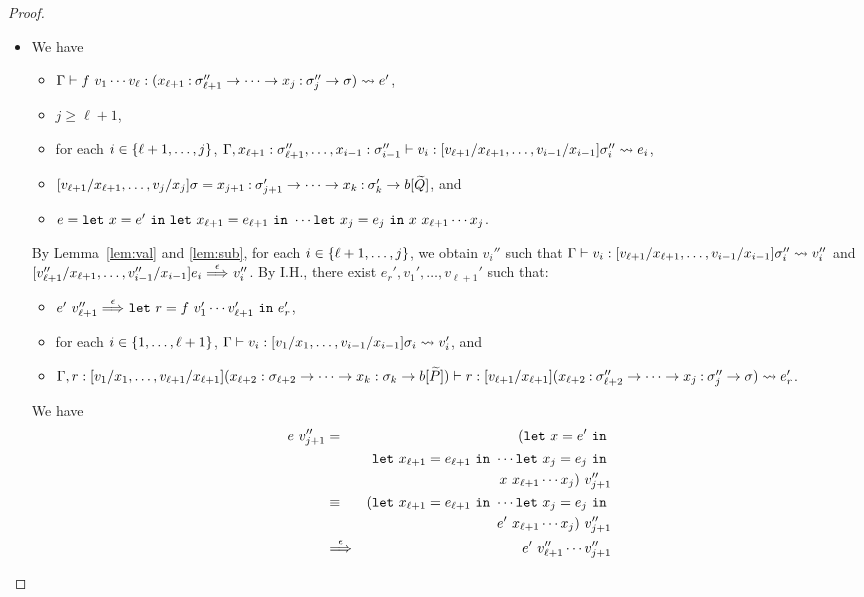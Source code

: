 \begin{proof}
\begin{itemize}
\item[] 
We have
\begin{itemize}
\item \(\Gamma \vdash f\ v_1\cdots v_{\ell} : (x_{\ell+1}\mathbin{:}\sigma_{\ell+1}'' \to \cdots \to x_j\mathbin{:}\sigma_j'' \to \sigma) \leadsto e'\),
\item \(j \geq \ell+1\),
\item for each \(i\in\{\ell+1,\ldots,j\}\), \(\Gamma,x_{\ell+1}:\sigma_{\ell+1}'',\dots,x_{i-1}:\sigma_{i-1}'' \vdash v_i : [v_{\ell+1}/x_{\ell+1},\ldots,v_{i-1}/x_{i-1}]\sigma_i'' \leadsto e_i\),
\item \([v_{\ell+1}/x_{\ell+1},\dots,v_j/x_j]\sigma=x_{j+1}\mathbin{:}\sigma_{j+1}' \to \cdots \to x_k\mathbin{:}\sigma_k' \to b[\widetilde{Q}]\), and
\item \(e=\mathtt{let~}x=e'\mathtt{~in~}\mathtt{let~}x_{\ell+1}=e_{\ell+1}\mathtt{~in~}\cdots\mathtt{let~}x_j=e_j\mathtt{~in~}x\ x_{\ell+1}\cdots x_j\).
\end{itemize}
By Lemma~\ref{lem:val} and \ref{lem:sub}, for each \(i \in \{\ell+1,\dots,j\}\), we obtain \(v_i''\) such that
\(\Gamma \vdash v_i : [v_{\ell+1}/x_{\ell+1},\dots,v_{i-1}/x_{i-1}]\sigma_i'' \leadsto v_i''\) and
\([v_{\ell+1}''/x_{\ell+1},\dots,v_{i-1}''/x_{i-1}]e_i \stackrel{\epsilon}{\Longrightarrow}_{} v_i''\).
%
By I.H., there exist \(e_r',v_1',\dots,v_{\ell+1}'\) such that:
\begin{itemize}
\item \(e'\ v_{\ell+1}'' \stackrel{\epsilon}{\Longrightarrow}_{} \mathtt{let~}r=f\ v_1'\cdots v_{\ell+1}'\mathtt{~in~}e_r'\),
\item for each \(i \in \{1,\dots,\ell+1\}\), \(\Gamma \vdash v_i : [v_1/x_1,\dots,v_{i-1}/x_{i-1}]\sigma_i \leadsto v_i'\), and
\item
\(\Gamma,r:[v_1/x_1,\dots,v_{\ell+1}/x_{\ell+1}](x_{\ell+2}:\sigma_{\ell+2} \to \cdots \to x_k:\sigma_k \to b[\widetilde{P}]) \vdash r : [v_{\ell+1}/x_{\ell+1}](x_{\ell+2}\mathbin{:}\sigma_{\ell+2}'' \to \cdots \to x_j\mathbin{:}\sigma_j'' \to \sigma) \leadsto e_r'\).
\end{itemize}
%
We have
\begin{eqnarray*}
e\ v_{j+1}''&=&(\LETEQIN{x}{e'} \\
&&\LETEQIN{x_{\ell+1}}{e_{\ell+1}}\cdots\LETEQIN{x_j}{e_j} \\
&&x\ x_{\ell+1}\cdots x_j)\ v_{j+1}'' \\
&\equiv&(\LETEQIN{x_{\ell+1}}{e_{\ell+1}}\cdots\LETEQIN{x_j}{e_j} \\
&&e'\ x_{\ell+1}\cdots x_j)\ v_{j+1}'' \\
&\redswith{\epsilon}{}&e'\ v_{\ell+1}''\cdots v_{j+1}'' \\

\end{eqnarray*}
\end{itemize}
\end{proof}
